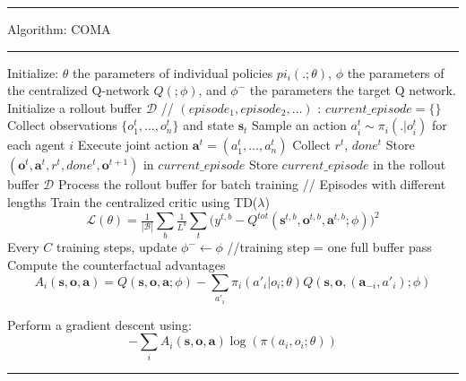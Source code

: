 \documentclass[varwidth, border=20pt]{standalone}
\begin{document}
\begingroup
\small                    
\begin{center}
  \begin{minipage}{0.99\linewidth} 
    \hrule height 0.7pt
    \vspace{3pt}
    Algorithm: COMA
    \vspace{3pt}
    \hrule height 0.7pt
    \vspace{6pt}

   
    \begin{algorithmic}[1]
      \State Initialize: $\theta$ the parameters of individual policies $pi_i(.;\theta)$, $\phi$ the parameters of the centralized Q-network $Q(;\phi)$, and $\phi^-$ the parameters the target Q network. 
        \State Initialize a rollout buffer $\mathcal{D}$ // $(episode_1, episode_2, \dots)$
        :
            \State $current\_episode = \{ \}$ 
                \State Collect observations $\{o^t_1,\dots,o^t_n\}$ and state $\mathbf{s}_t$
                \State  Sample an action $a_i^t \sim \pi_i(.|o_i^t)$ for each agent $i$
                \State Execute joint action $\mathbf{a}^t = (a_1^t,\dots,a_n^t)$
                \State Collect $r^t$, $done^t$
                \State Store $(\mathbf{o}^t,\mathbf{a}^t,r^t,done^t,\mathbf{o}^{t+1})$ in $current\_episode$
                \EndWhile
            \State Store $current\_episode$ in the rollout buffer $\mathcal{D}$
        \EndFor
        \State Process the rollout buffer for batch training // Episodes with different lengths
        \State Train the centralized critic using TD($\lambda$)
        \Statex
          \[
            \mathcal{L}(\theta)=\tfrac{1}{|\mathcal{B}|}\sum_b \tfrac{1}{L^b} \sum_t \Big(y^{t,b}- Q^{tot}(\mathbf{s}^{t,b},\mathbf{o}^{t,b},\mathbf{a}^{t,b}; \phi)\Big)^2
          \]
        \State Every $C$ training steps, update $\phi^- \leftarrow \phi$ //training step = one full buffer pass
        \State Compute the counterfactual advantages
         \[
            A_i(\mathbf{s}, \mathbf{o},\mathbf{a}) = Q(\mathbf{s}, \mathbf{o},\mathbf{a};\phi) - \sum_{a'_i} \pi_i(a'_i|o_i;\theta) Q(\mathbf{s}, \mathbf{o},(\mathbf{a}_{-i},a'_i);\phi)
         \]

         \State Perform a gradient descent using:
         \[ 
             - \sum_i A_i(\mathbf{s}, \mathbf{o},\mathbf{a}) \log(\pi(a_i,o_i;\theta))
         \]

      \EndWhile
    \end{algorithmic}

    \vspace{6pt}
    \hrule height 0.7pt
  \end{minipage}
\end{center}
\endgroup
\end{document}
